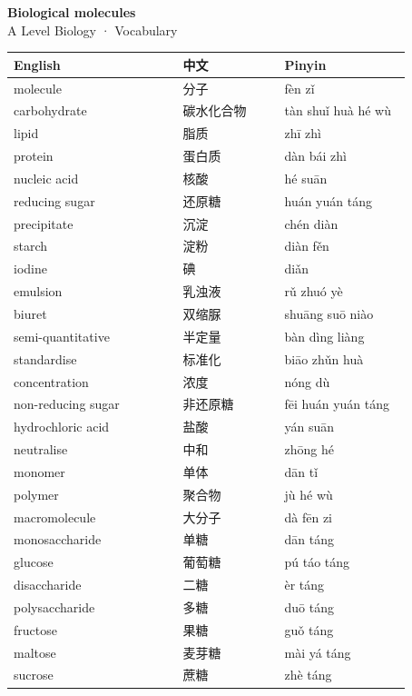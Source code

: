 \documentclass[11pt]{article}
\begin{document}
\begin{center}
  {\LARGE\bfseries Biological molecules}\\[0.35em]
  {\large A Level Biology · Vocabulary}
\end{center}
\vspace{0.6em}

\begin{longtable}{@{}p{0.40\linewidth}p{0.24\linewidth}p{0.30\linewidth}@{}}
\toprule
\textbf{English} & \textbf{中文} & \textbf{Pinyin} \\
\midrule
\endhead
\bottomrule
\endlastfoot
molecule & 分子 & fèn zǐ \\
carbohydrate & 碳水化合物 & tàn shuǐ huà hé wù \\
lipid & 脂质 & zhī zhì \\
protein & 蛋白质 & dàn bái zhì \\
nucleic acid & 核酸 & hé suān \\
reducing sugar & 还原糖 & huán yuán táng \\
precipitate & 沉淀 & chén diàn \\
starch & 淀粉 & diàn fěn \\
iodine & 碘 & diǎn \\
emulsion & 乳浊液 & rǔ zhuó yè \\
biuret & 双缩脲 & shuāng suō niào \\
semi-quantitative & 半定量 & bàn dìng liàng \\
standardise & 标准化 & biāo zhǔn huà \\
concentration & 浓度 & nóng dù \\
non-reducing sugar & 非还原糖 & fēi huán yuán táng \\
hydrochloric acid & 盐酸 & yán suān \\
neutralise & 中和 & zhōng hé \\
monomer & 单体 & dān tǐ \\
polymer & 聚合物 & jù hé wù \\
macromolecule & 大分子 & dà fēn zi \\
monosaccharide & 单糖 & dān táng \\
glucose & 葡萄糖 & pú táo táng \\
disaccharide & 二糖 & èr táng \\
polysaccharide & 多糖 & duō táng \\
fructose & 果糖 & guǒ táng \\
maltose & 麦芽糖 & mài yá táng \\
sucrose & 蔗糖 & zhè táng \\

\end{longtable}
\end{document}
